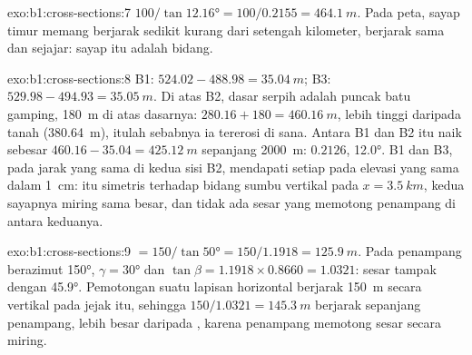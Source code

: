 \begin{solution}{exo:b1:cross-sections:7}
$100/\tan\ang{12.16} = 100/0.2155 = \qty{464.1}{m}$. Pada peta,  sayap timur memang berjarak sedikit kurang dari setengah kilometer, berjarak sama dan sejajar: sayap itu adalah bidang.
\end{solution}

\begin{solution}{exo:b1:cross-sections:8}
B1: $524.02 - 488.98 = \qty{35.04}{m}$; B3: $529.98 - 494.93 =
\qty{35.05}{m}$. Di atas B2, dasar serpih adalah puncak batu gamping, \qty{180}{m} di atas dasarnya: $280.16 + 180 = \qty{460.16}{m}$,
lebih tinggi daripada tanah (\qty{380.64}{m}), itulah sebabnya ia tererosi di sana.
Antara B1 dan B2  itu naik sebesar $460.16 - 35.04 = \qty{425.12}{m}$
sepanjang \qty{2000}{m}:  $0.2126$,  \ang{12.0}. B1
dan B3, pada jarak yang sama di kedua sisi B2, mendapati setiap  pada elevasi yang sama dalam \qty{1}{cm}:  itu simetris terhadap bidang sumbu vertikal pada $x = \qty{3.5}{km}$, kedua sayapnya miring sama besar, dan tidak ada sesar yang memotong penampang di antara keduanya.
\end{solution}

\begin{solution}{exo:b1:cross-sections:9}
 $= 150/\tan\ang{50} = 150/1.1918 = \qty{125.9}{m}$. Pada penampang berazimut \ang{150}, $\gamma = \ang{30}$ dan $\tan\beta = 1.1918\times0.8660 =
1.0321$: sesar tampak dengan  \ang{45.9}. Pemotongan suatu lapisan horizontal berjarak \qty{150}{m} secara vertikal pada jejak itu, sehingga $150/1.0321 = \qty{145.3}{m}$ berjarak sepanjang penampang, lebih besar daripada , karena penampang memotong sesar secara miring.
\end{solution}

